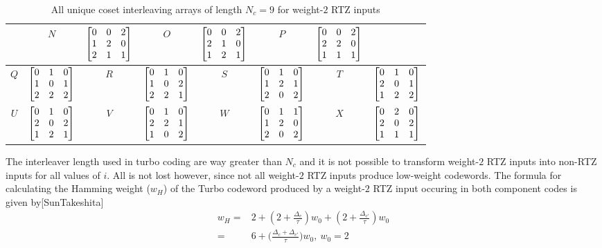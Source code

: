 \documentclass[11pt, oneside, dvipdfmx]{book}
\begin{document}
\begin{table}[h!]
\begin{tabular}{|c || c | c|| c|c || c | c|| c|}
 &
  $N$ & $\begin{bmatrix}0 & 0 & 2 \cr 1 & 2 & 0 \cr 2 & 1 & 1 \end{bmatrix}$ 
 &
 $O$ & $\begin{bmatrix}0 & 0 & 2 \cr 2 & 1 & 0 \cr 1 & 2 & 1\end{bmatrix}$ 
&
 $P$ & $\begin{bmatrix}0 & 0 & 2 \cr 2 & 2 & 0 \cr 1 & 1 & 1\end{bmatrix}$\\ 
 \hline
 $Q$ & $\begin{bmatrix}0 & 1 & 0 \cr 1 & 0 & 1 \cr 2 & 2 & 2 \end{bmatrix}$
&
  $R$ & $\begin{bmatrix}0 & 1 & 0 \cr 1 & 0 & 2 \cr 2 & 2 & 1\end{bmatrix}$ 
&
 $S$ & $\begin{bmatrix}0 & 1 & 0 \cr 1 & 2 & 1 \cr 2 & 0 & 2 \end{bmatrix}$
 &
 $T$ & $\begin{bmatrix}0 & 1 & 0 \cr 2 & 0 & 1 \cr 1 & 2 & 2\end{bmatrix}$\\ 
 \hline
 $U$ & $\begin{bmatrix}0 & 1 & 0 \cr 2 & 0 & 2 \cr 1 & 2 & 1\end{bmatrix}$ 
 &
 $V$ & $\begin{bmatrix}0 & 1 & 0 \cr 2 & 2 & 1 \cr 1 & 0 & 2\end{bmatrix}$ 
 &
 $W$ & $\begin{bmatrix}0 & 1 & 1 \cr 1 & 2 & 0 \cr 2 & 0 & 2 \end{bmatrix}$
 &
 $X$ & $\begin{bmatrix}0 & 2 & 0 \cr 2 & 0 & 2 \cr 1 & 1 & 1\end{bmatrix}$\\ 
   \hline

  \end{tabular}
\caption{All unique coset interleaving arrays of length $N_c =9$ for weight-$2$ RTZ inputs}
\label{tb1}
\end{table}

The interleaver length used in turbo coding are way greater than $N_c$ and it is not possible to transform weight-$2$ RTZ inputs into non-RTZ inputs for all values of $i$. All is not lost however, since not all weight-$2$ RTZ inputs produce low-weight codewords. 
The formula for calculating the Hamming weight ($w_H$) of the Turbo codeword produced by a weight-$2$ RTZ input occuring in both component codes is given by[SunTakeshita] 
\begin{equation}
\begin{split}
w_H=&2+(2 + \frac{\Delta_c}{\tau} )w_0+ (2 + \frac{\Delta_{c'}}{\tau})w_0\\
=&6+\Big(\frac{\Delta_c+\Delta_{c'}}{\tau}\Big)w_0,~w_0=2
\end{split}
\label{eq3}
\end{equation}
\end{document}

